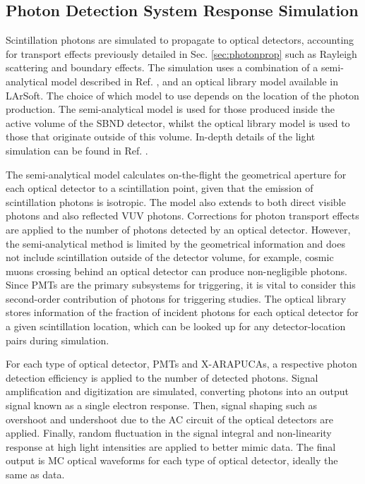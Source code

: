 \subsection{Photon Detection System Response Simulation}
\label{sec:pds_response}

Scintillation photons are simulated to propagate to optical detectors, accounting for transport effects previously detailed in Sec. \ref{sec:photonprop} such as Rayleigh scattering and boundary effects.
The simulation uses a combination of a semi-analytical model described in Ref. \cite{pds_sim}, and an optical library model available in LArSoft.
The choice of which model to use depends on the location of the photon production.
The semi-analytical model is used for those produced inside the active volume of the SBND detector, whilst the optical library model is used to those that originate outside of this volume.
In-depth details of the light simulation can be found in Ref. \cite{sbnd_pds_paper}.

The semi-analytical model calculates on-the-flight the geometrical aperture for each optical detector to a scintillation point, given that the emission of scintillation photons is isotropic.
The model also extends to both direct visible photons and also reflected VUV photons. 
Corrections for photon transport effects are applied to the number of photons detected by an optical detector.
However, the semi-analytical method is limited by the geometrical information and does not include scintillation outside of the detector volume, for example, cosmic muons crossing behind an optical detector can produce non-negligible photons.
Since PMTs are the primary subsystems for triggering, it is vital to consider this second-order contribution of photons for triggering studies.
The optical library stores information of the fraction of incident photons for each optical detector for a given scintillation location, which can be looked up for any detector-location pairs during simulation. 

For each type of optical detector, PMTs and X-ARAPUCAs, a respective photon detection efficiency is applied to the number of detected photons.
Signal amplification and digitization are simulated, converting photons into an output signal known as a single electron response.
Then, signal shaping such as overshoot and undershoot due to the AC circuit of the optical detectors are applied.
Finally, random fluctuation in the signal integral and non-linearity response at high light intensities are applied to better mimic data.
The final output is MC optical waveforms for each type of optical detector, ideally the same as data. 

